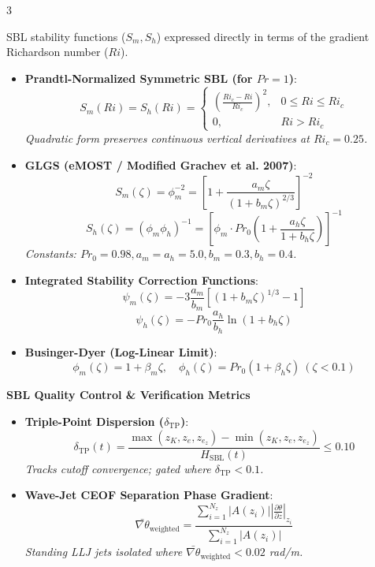 \documentclass[9pt,landscape,letterpaper]{article}
\begin{document}
\begin{multicols}{3}
\begin{tcolorbox}[cheatsheetbox, title=5. Standard Empirical Closures]
SBL stability functions ($S_m, S_h$) expressed directly in terms of the gradient Richardson number ($Ri$).
\begin{itemize}
    \item \textbf{Prandtl-Normalized Symmetric SBL (for $Pr = 1$)}:
    $$S_m(Ri) = S_h(Ri) = \begin{cases} \left( \frac{Ri_c - Ri}{Ri_c} \right)^2, & 0 \le Ri \le Ri_c \\ 0, & Ri > Ri_c \end{cases}$$
    \textit{Quadratic form preserves continuous vertical derivatives at $Ri_c = 0.25$.}
    \item \textbf{GLGS (eMOST / Modified Grachev et al. 2007)}:
    $$S_m(\zeta) = \phi_m^{-2} = \left[ 1 + \frac{a_m \zeta}{(1 + b_m \zeta)^{2/3}} \right]^{-2}$$
    $$S_h(\zeta) = (\phi_m \phi_h)^{-1} = \left[ \phi_m \cdot Pr_0 \left( 1 + \frac{a_h \zeta}{1 + b_h \zeta} \right) \right]^{-1}$$
    \textit{Constants: $Pr_0 = 0.98, a_m = a_h = 5.0, b_m = 0.3, b_h = 0.4$.}
    \item \textbf{Integrated Stability Correction Functions}:
    $$\psi_m(\zeta) = -3 \frac{a_m}{b_m} \left[ (1 + b_m \zeta)^{1/3} - 1 \right]$$
    $$\psi_h(\zeta) = -Pr_0 \frac{a_h}{b_h} \ln(1 + b_h \zeta)$$
    \item \textbf{Businger-Dyer (Log-Linear Limit)}:
    $$\phi_m(\zeta) = 1 + \beta_m \zeta, \quad \phi_h(\zeta) = Pr_0(1 + \beta_h \zeta) \ (\zeta < 0.1)$$
\end{itemize}
\tcblower
\textbf{SBL Quality Control \& Verification Metrics}
\begin{itemize}
    \item \textbf{Triple-Point Dispersion ($\delta_{\text{TP}}$)}:
    $$\delta_{\text{TP}}(t) = \frac{\max(z_K, z_e, z_{e_z}) - \min(z_K, z_e, z_{e_z})}{H_{\text{SBL}}(t)} \le 0.10$$
    \textit{Tracks cutoff convergence; gated where $\delta_{\text{TP}} < 0.1$.}
    \item \textbf{Wave-Jet CEOF Separation Phase Gradient}:
    $$\bar{\nabla \theta}_{\text{weighted}} = \frac{\sum_{i=1}^{N_z} |A(z_i)| \left| \frac{\partial \theta}{\partial z} \right|_{z_i}}{\sum_{i=1}^{N_z} |A(z_i)|}$$
    \textit{Standing LLJ jets isolated where $\bar{\nabla \theta}_{\text{weighted}} < 0.02$ rad/m.}
\end{itemize}
\end{tcolorbox}
\columnbreak


\end{multicols}
\end{document}
